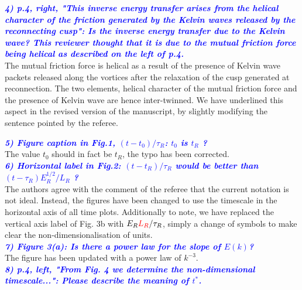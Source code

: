 \documentclass[a4paper,10pt]{article}
\def\red#1{\textcolor{red}{#1}}
\def\blue#1{\textcolor{blue}{#1}}
\def\refcomment#1{\textbf{\blue{\emph{#1}}}\\}
\begin{document}
    \refcomment{4) p.4, right, "This inverse energy transfer arises from the helical
    character of the friction generated by the Kelvin waves released by
    the reconnecting cusp": Is the inverse energy transfer due to the
    Kelvin wave? This reviewer thought that it is due to the mutual
    friction force being helical as described on the left of p.4.}

    The mutual friction force is helical as a result of the presence of Kelvin wave packets released along the vortices after the relaxation of the cusp generated at reconnection. The two elements, helical character of the mutual friction force and the presence of Kelvin wave are hence inter-twinned. We have 
underlined this aspect in the revised version of the manuscript, by slightly modifying the sentence pointed by the referee.  
  
    \refcomment{5) Figure caption in Fig.1, $(t - t_0)/\tau_R$: $t_0$ is $t_R$ ?}

    The value $t_0$ should in fact be $t_R$, the typo has been corrected.\\
    
    \refcomment{6) Horizontal label in Fig.2: $(t - t_R)/\tau_R$ would be better than $(t- \tau_R)E_R^{1/2}/L_R$ ?}

    The authors agree with the comment of the referee that the current notation is not ideal. Instead, the figures have been changed to use the timescale in the horizontal axis of all time plots. Additionally to note, we have replaced the vertical axis label of Fig. 3b with $E_R \red{L_R}/\tau_R$, simply a change of symbols to make clear the non-dimensionalisation of units.\\
    
    \refcomment{7) Figure 3(a): Is there a power law for the slope of $E(k)$?}

    The figure has been updated with a power law of $k^{-3}$.\\
    
    \refcomment{8) p.4, left, "From Fig. 4 we determine the non-dimensional
    timescale...": Please describe the meaning of $t^*$.}
\end{document}
